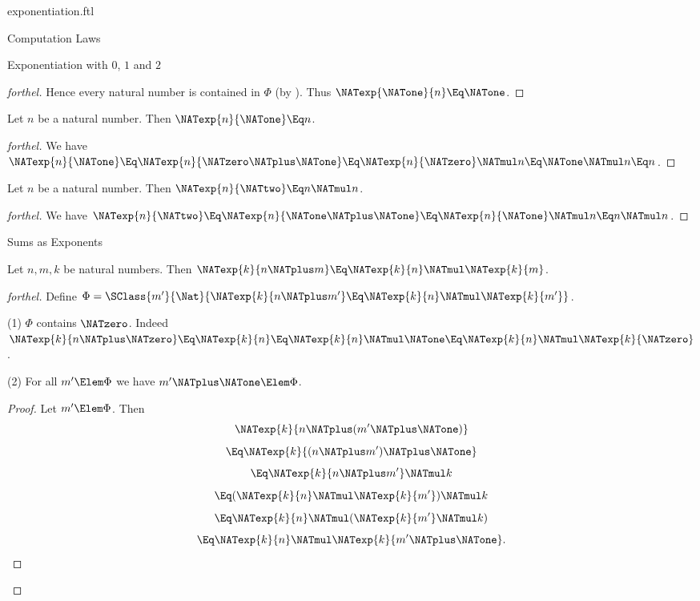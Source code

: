 \documentclass{stex}
\begin{document}
\begin{smodule}{exponentiation.ftl}
\begin{sfragment}{Computation Laws}
\begin{sfragment}{Exponentiation with $0$, $1$ and $2$}
\begin{proof}[forthel]
      Hence every natural number is contained in $\Phi$ (by ).
      Thus $\NATexp{\NATone}{n} \Eq \NATone$.
    \end{proof}

    \begin{proposition}[forthel]
      Let $n$ be a natural number.
      Then $\NATexp{n}{\NATone} \Eq n$.
    \end{proposition}
    \begin{proof}[forthel]
      We have $\NATexp{n}{\NATone}
        \Eq \NATexp{n}{\NATzero \NATplus \NATone}
        \Eq \NATexp{n}{\NATzero} \NATmul n
        \Eq \NATone \NATmul n
        \Eq n$.
    \end{proof}

    \begin{proposition}[forthel]
      Let $n$ be a natural number.
      Then $\NATexp{n}{\NATtwo} \Eq n \NATmul n$.
    \end{proposition}
    \begin{proof}[forthel]
      We have $\NATexp{n}{\NATtwo}
        \Eq \NATexp{n}{\NATone \NATplus \NATone}
        \Eq \NATexp{n}{\NATone} \NATmul n
        \Eq n \NATmul n$.
    \end{proof}
  \end{sfragment}

  \begin{sfragment}{Sums as Exponents}
    \begin{proposition}[forthel]
      Let $n, m, k$ be natural numbers.
      Then $\NATexp{k}{n \NATplus m} \Eq \NATexp{k}{n} \NATmul \NATexp{k}{m}$.
    \end{proposition}
    \begin{proof}[forthel]
      Define $\Phi = \SClass{m'}{\Nat}{\NATexp{k}{n \NATplus m'} \Eq \NATexp{k}{n} \NATmul \NATexp{k}{m'}}$.

      (1) $\Phi$ contains $\NATzero$.
      Indeed $\NATexp{k}{n \NATplus \NATzero}
        \Eq \NATexp{k}{n}
        \Eq \NATexp{k}{n} \NATmul \NATone
        \Eq \NATexp{k}{n} \NATmul \NATexp{k}{\NATzero}$.

      (2) For all $m' \Elem \Phi$ we have $m' \NATplus \NATone \Elem \Phi$.
      \begin{proof}
        Let $m' \Elem \Phi$.
        Then
        \[  \NATexp{k}{n \NATplus (m' \NATplus \NATone)}                  \]
        \[    \Eq \NATexp{k}{(n \NATplus m') \NATplus \NATone}              \]
        \[    \Eq \NATexp{k}{n \NATplus m'} \NATmul k            \]
        \[    \Eq (\NATexp{k}{n} \NATmul \NATexp{k}{m'}) \NATmul k  \]
        \[    \Eq \NATexp{k}{n} \NATmul (\NATexp{k}{m'} \NATmul k)  \]
        \[    \Eq \NATexp{k}{n} \NATmul \NATexp{k}{m' \NATplus \NATone}.       \]
      \end{proof}


\end{proof}
\end{sfragment}
\end{sfragment}
\end{smodule}
\end{document}
